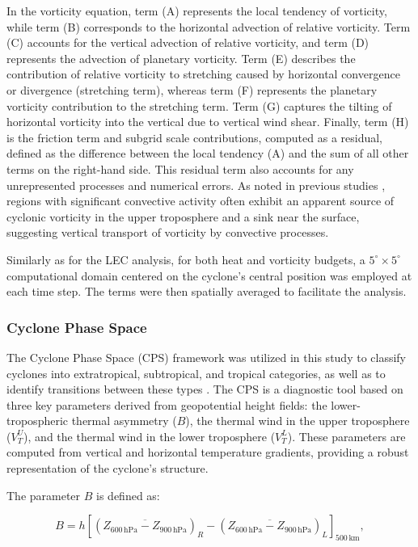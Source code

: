 \documentclass[pdflatex,sn-chicago]{sn-jnl}%
\theoremstyle{plain}
\theoremstyle{definition}
\theoremstyle{remark}
\theoremstyle{definition}
\begin{document}
In the vorticity equation, term (A) represents the local tendency of vorticity, while term (B) corresponds to the horizontal advection of relative vorticity. Term (C) accounts for the vertical advection of relative vorticity, and term (D) represents the advection of planetary vorticity. Term (E) describes the contribution of relative vorticity to stretching caused by horizontal convergence or divergence (stretching term), whereas term (F) represents the planetary vorticity contribution to the stretching term. Term (G) captures the tilting of horizontal vorticity into the vertical due to vertical wind shear. Finally, term (H) is the friction term and subgrid scale contributions, computed as a residual, defined as the difference between the local tendency (A) and the sum of all other terms on the right-hand side. This residual term also accounts for any unrepresented processes and numerical errors. As noted in previous studies \citep[e.g.,]{reed1974vorticity, chu1981effects}, regions with significant convective activity often exhibit an apparent source of cyclonic vorticity in the upper troposphere and a sink near the surface, suggesting vertical transport of vorticity by convective processes.

Similarly as for the LEC analysis, for both heat and vorticity budgets, a \(5^\circ \times 5^\circ\) computational domain centered on the cyclone's central position was employed at each time step. The terms were then spatially averaged to facilitate the analysis.


\subsubsection{Cyclone Phase Space}

The Cyclone Phase Space (CPS) framework was utilized in this study to classify cyclones into extratropical, subtropical, and tropical categories, as well as to identify transitions between these types \citep{hart2003cyclone}. The CPS is a diagnostic tool based on three key parameters derived from geopotential height fields: the lower-tropospheric thermal asymmetry (\(B\)), the thermal wind in the upper troposphere (\(V_T^U\)), and the thermal wind in the lower troposphere (\(V_T^L\)). These parameters are computed from vertical and horizontal temperature gradients, providing a robust representation of the cyclone's structure.

The parameter \(B\) is defined as:

\begin{equation}
B = h \left[ \left( \overline{Z_{600\, \text{hPa}} - Z_{900\, \text{hPa}}} \right)_R - \left( \overline{Z_{600\, \text{hPa}} - Z_{900\, \text{hPa}}} \right)_L \right]_{500\, \text{km}},
\end{equation}
\end{document}
